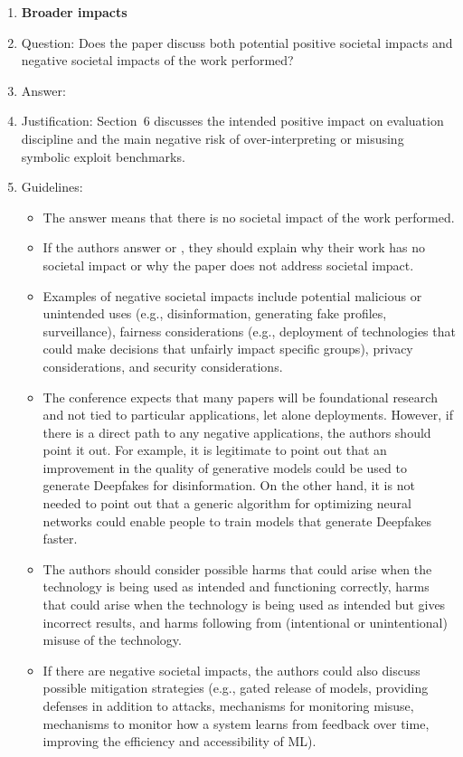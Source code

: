 \documentclass{article}
\begin{document}
\begin{enumerate}
\item {\bf Broader impacts}
    \item[] Question: Does the paper discuss both potential positive societal impacts and negative societal impacts of the work performed?
    \item[] Answer: \answerYes{}
    \item[] Justification: Section~6 discusses the intended positive impact on evaluation discipline and the main negative risk of over-interpreting or misusing symbolic exploit benchmarks.
    \item[] Guidelines:
    \begin{itemize}
        \item The answer \answerNA{} means that there is no societal impact of the work performed.
        \item If the authors answer \answerNA{} or \answerNo, they should explain why their work has no societal impact or why the paper does not address societal impact.
        \item Examples of negative societal impacts include potential malicious or unintended uses (e.g., disinformation, generating fake profiles, surveillance), fairness considerations (e.g., deployment of technologies that could make decisions that unfairly impact specific groups), privacy considerations, and security considerations.
        \item The conference expects that many papers will be foundational research and not tied to particular applications, let alone deployments. However, if there is a direct path to any negative applications, the authors should point it out. For example, it is legitimate to point out that an improvement in the quality of generative models could be used to generate Deepfakes for disinformation. On the other hand, it is not needed to point out that a generic algorithm for optimizing neural networks could enable people to train models that generate Deepfakes faster.
        \item The authors should consider possible harms that could arise when the technology is being used as intended and functioning correctly, harms that could arise when the technology is being used as intended but gives incorrect results, and harms following from (intentional or unintentional) misuse of the technology.
        \item If there are negative societal impacts, the authors could also discuss possible mitigation strategies (e.g., gated release of models, providing defenses in addition to attacks, mechanisms for monitoring misuse, mechanisms to monitor how a system learns from feedback over time, improving the efficiency and accessibility of ML).
    \end{itemize}


\end{enumerate}
\end{document}
